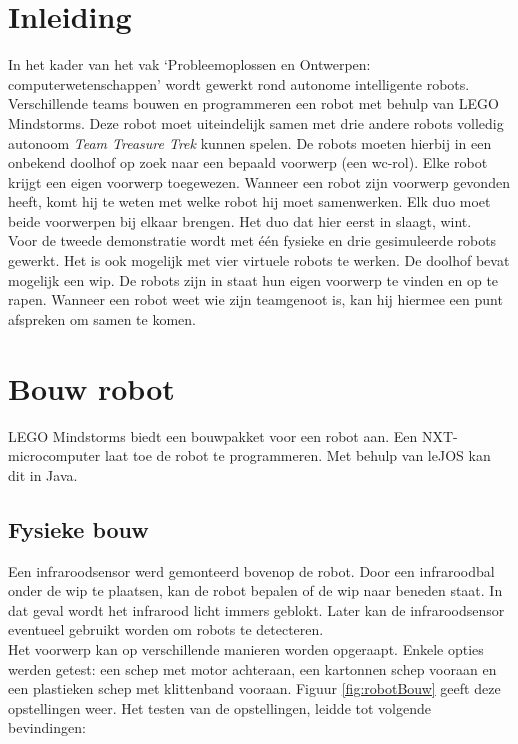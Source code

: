 \documentclass[tt2]{penoverslag}
\begin{document}
\newpage


\section{Inleiding} %
\label{ssec:inl}
In het kader van het vak `Probleemoplossen en Ontwerpen: computerwetenschappen' wordt gewerkt rond autonome intelligente robots. Verschillende teams bouwen en programmeren een robot met behulp van LEGO Mindstorms. Deze robot moet uiteindelijk samen met drie andere robots volledig autonoom \textit{Team Treasure Trek} kunnen spelen.
De robots moeten hierbij in een onbekend doolhof op zoek naar een bepaald voorwerp (een wc-rol). Elke robot krijgt een eigen voorwerp toegewezen. Wanneer een robot zijn voorwerp gevonden heeft, komt hij te weten met welke robot hij moet samenwerken. Elk duo moet beide voorwerpen bij elkaar brengen. Het duo dat hier eerst in slaagt, wint.\\

Voor de tweede demonstratie wordt met \'e\'en fysieke en drie gesimuleerde robots gewerkt. Het is ook mogelijk met vier virtuele robots te werken. De doolhof bevat mogelijk een wip. De robots zijn in staat hun eigen voorwerp te vinden en op te rapen. Wanneer een robot weet wie zijn teamgenoot is, kan hij hiermee een punt afspreken om samen te komen.\\


\section{Bouw robot}
\label{ssec:bouwrob}
LEGO Mindstorms biedt een bouwpakket voor een robot aan. Een NXT-microcomputer laat toe de robot te programmeren. Met behulp van leJOS kan dit in Java.

\subsection{Fysieke bouw}
\label{ssec:fysb}
Een infraroodsensor werd gemonteerd bovenop de robot. Door een infraroodbal onder de wip te plaatsen, kan de robot bepalen of de wip naar beneden staat. In dat geval wordt het infrarood licht immers geblokt. Later kan de infraroodsensor eventueel gebruikt worden om robots te detecteren.\\

Het voorwerp kan op verschillende manieren worden opgeraapt. Enkele opties werden getest: een schep met motor achteraan, een kartonnen schep vooraan en een plastieken schep met klittenband vooraan. Figuur \ref{fig:robotBouw} geeft deze opstellingen weer. Het testen van de opstellingen, leidde tot volgende bevindingen:
\end{document}
